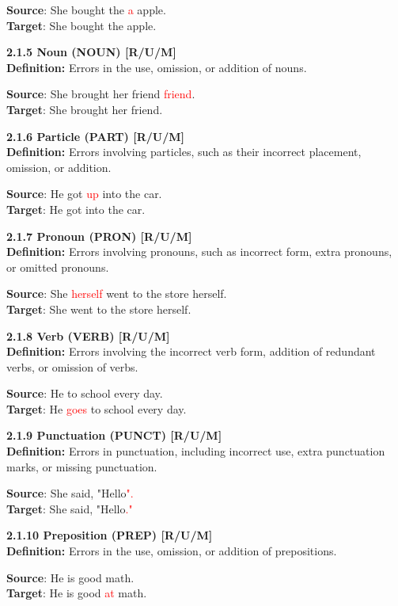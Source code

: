 \begin{tcolorbox}[breakable]
\textbf{Source}: She bought the \textcolor{red}{a} apple. \\
\textbf{Target}: She bought the apple.


\noindent \textbf{2.1.5 Noun (NOUN) [R/U/M]}\\
\textbf{Definition:} Errors in the use, omission, or addition of nouns.


\textbf{Source}: She brought her friend \textcolor{red}{friend}. \\
\textbf{Target}: She brought her friend.


\noindent \textbf{2.1.6 Particle (PART) [R/U/M]}\\
\textbf{Definition:} Errors involving particles, such as their incorrect placement, omission, or addition.


\textbf{Source}: He got \textcolor{red}{up} into the car. \\
\textbf{Target}: He got into the car.


\noindent \textbf{2.1.7 Pronoun (PRON) [R/U/M]}\\
\textbf{Definition:} Errors involving pronouns, such as incorrect form, extra pronouns, or omitted pronouns.


\textbf{Source}: She \textcolor{red}{herself} went to the store herself. \\
\textbf{Target}: She went to the store herself.


\noindent \textbf{2.1.8 Verb (VERB) [R/U/M]}\\
\textbf{Definition:} Errors involving the incorrect verb form, addition of redundant verbs, or omission of verbs.


\textbf{Source}: He to school every day. \\
\textbf{Target}: He \textcolor{red}{goes} to school every day.


\noindent \textbf{2.1.9 Punctuation (PUNCT) [R/U/M]}\\
\textbf{Definition:} Errors in punctuation, including incorrect use, extra punctuation marks, or missing punctuation.


\textbf{Source}: She said, "Hello\textcolor{red}{".} \\
\textbf{Target}: She said, "Hello\textcolor{red}{."}


\noindent \textbf{2.1.10 Preposition (PREP) [R/U/M]}\\
\textbf{Definition:} Errors in the use, omission, or addition of prepositions.


\textbf{Source}: He is good math. \\
\textbf{Target}: He is good \textcolor{red}{at} math.



\end{tcolorbox}
